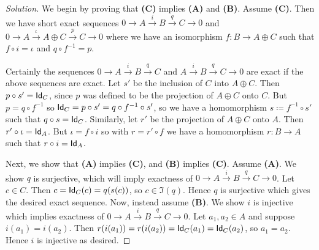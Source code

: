 \begin{proof}[Solution]
  We begin by proving that \textbf{(C)} implies \textbf{(A)} and \textbf{(B)}. Assume \textbf{(C)}. Then we have short exact sequences $0 \to A \overset{i}{\to} B \overset{q}{\to} C \to 0$ and $0 \to A \overset{\iota}{\to} A \oplus C \overset{p}{\to} C \to 0$ where we have an isomorphism $f: B \to A \oplus C$ such that $f \circ i  = \iota$ and $ q \circ f^{-1}= p$.

   Certainly the sequences $0 \to A \overset{i}{\to} B \overset{q}{\to} C$ and $A \overset{i}{\to} B \overset{q}{\to} C \to 0$ are exact if the above sequences are exact. Let $s'$ be the inclusion of $C$ into $A\oplus C$. Then $ p \circ s'= \mathsf{Id}_C$, since $p$ was defined to be the projection of $A\oplus C$ onto $C$. But $p = q \circ f^{-1}$ so $\mathsf{Id}_C = p \circ s' = q \circ f^{-1} \circ s'$, so we have a homomorphism $s \coloneqq f^{-1} \circ s'$ such that $q\circ s = \mathsf{Id}_C$. Similarly, let $r'$ be the projection of $A \oplus C$ onto $A$. Then $r' \circ \iota = \mathsf{Id}_A$. But $\iota = f \circ i$ so with $r = r' \circ f$ we have a homomorphism $r : B \to A$ such that $r \circ i = \mathsf{Id}_A$.

   Next, we show that \textbf{(A)} implies \textbf{(C)}, and \textbf{(B)} implies \textbf{(C)}. Assume \textbf{(A)}. We show $q$ is surjective, which will imply exactness of $0 \to A \overset{i}{\to} B \overset{q}{\to} C \to 0$. Let $c \in C$. Then $c = \mathsf{Id}_C(c) = q(s(c))$, so $c \in \Im(q)$. Hence $q$ is surjective which gives the desired exact sequence. Now, instead assume \textbf{(B)}. We show $i$ is injective which implies exactness of $0 \to A \overset{i}{\to} B \overset{q}{\to} C \to 0$. Let $a_1, a_2 \in A$ and suppose $i(a_1) = i(a_2)$. Then $r(i(a_1)) = r(i(a_2)) = \mathsf{Id}_C(a_1) = \mathsf{Id}_C(a_2)$, so $a_1 = a_2$. Hence $i$ is injective as desired.


\end{proof}
